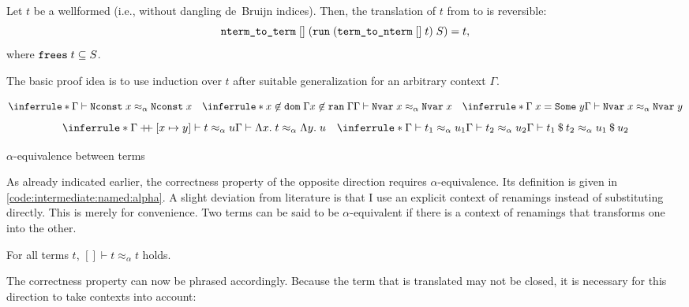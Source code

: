 \begin{lemma}
  \label{thm:intermediate:named:translate}
  Let $t$ be a wellformed  (i.e., without dangling de~Bruijn indices).
  Then, the translation of $t$ from  to  is reversible:
  \[ \texttt{\textup{nterm\_to\_term}}\;[]\;(\texttt{\textup{run}}\;(\texttt{\textup{term\_to\_nterm}}\;[]\;t)\;S) = t, \]
  where $\texttt{\textup{frees}}\;t \subseteq S$.
\end{lemma}

\noindent
The basic proof idea is to use induction over $t$ after suitable generalization for an arbitrary context $\Gamma$.

\begin{code}[t]
  \[
    \inferrule*{
    }{\Gamma \vdash \holconst{Nconst}\;x \approx_\alpha \holconst{Nconst}\;x} \quad
    \inferrule*{
      x \not\in \holconst{dom}\;\Gamma \\
      x \not\in \holconst{ran}\;\Gamma
    }{\Gamma \vdash \holconst{Nvar}\;x \approx_\alpha \holconst{Nvar}\;x} \quad
    \inferrule*{
      \Gamma\;x = \holconst{Some}\;y
    }{\Gamma \vdash \holconst{Nvar}\;x \approx_\alpha \holconst{Nvar}\;y}
  \]
  \[
    \inferrule*{
      \envadd\Gamma{[ x \mapsto y ]} \vdash t \approx_\alpha u
    }{\Gamma \vdash \Lambda x.\; t \approx_\alpha \Lambda y.\; u} \quad
    \inferrule*{
      \Gamma \vdash t_1 \approx_\alpha u_1 \\
      \Gamma \vdash t_2 \approx_\alpha u_2
    }{\Gamma \vdash \app{t_1}{t_2} \approx_\alpha \app{u_1}{u_2}}
  \]
  \caption{$\alpha$-equivalence between terms}
  \label{code:intermediate:named:alpha}
\end{code}

As already indicated earlier, the correctness property of the opposite direction requires $\alpha$-equivalence.
Its definition is given in \cref{code:intermediate:named:alpha}.
A slight deviation from literature is that I use an explicit context of renamings instead of substituting directly.
This is merely for convenience.
Two terms can be said to be $\alpha$-equivalent if there is a context of renamings that transforms one into the other.

\begin{corollary}[Reflexivity]\label{thm:intermediate:named:refl}
  For all terms $t$, $[] \vdash t \approx_\alpha t$ holds.
\end{corollary}

\noindent
The correctness property can now be phrased accordingly.
Because the term that is translated may not be closed, it is necessary for this direction to take contexts into account:

